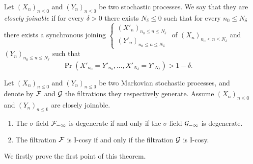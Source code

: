 \documentclass[12pt,a4paper]{article}
\begin{document}
\begin{definition}
Let ${(X_n)}_{n \leq 0}$ and ${(Y_n)}_{n \leq 0}$ be two stochastic processes. 
We say that they are \emph{closely joinable} if for every $\delta >0$ there exists 
$N_\delta \leq 0$ such that for every $n_0 \leq N_\delta$ there exists a 
synchronous joining $\left\{\begin{smallmatrix} {(X'_n)}_{n_0 \leq n \leq N_\delta} \\ 
{(Y'_n)}_{n_0 \leq n \leq N_\delta}
\end{smallmatrix}\right.$ 
of ${(X_n)}_{n_0 \leq n \leq N_\delta}$ and ${(Y_n)}_{n_0 \leq n \leq N_\delta}$ 
such that 
$$
\Pr(X'_{n_0}=Y'_{n_0}, \ldots, X'_{N_\delta}=Y'_{N_\delta}) > 1-\delta. 
$$ 
\end{definition}

\begin{thm}\label{thm:joinable}
Let ${(X_n)}_{n \leq 0}$ and ${(Y_n)}_{n \leq 0}$ be two Markovian stochastic processes, and 
denote by $\mathcal{F}$ and $\mathcal{G}$ the filtrations they respectively generate. 
Assume ${(X_n)}_{n \leq 0}$ and ${(Y_n)}_{n \leq 0}$ are closely joinable. 
\begin{enumerate}
\item The $\sigma$-field $\mathcal{F}_{-\infty}$ is degenerate if and 
only if the $\sigma$-field $\mathcal{G}_{-\infty}$ is degenerate.

\item The filtration $\mathcal{F}$ is I-cosy if and only if the filtration $\mathcal{G}$ is I-cosy.
\end{enumerate}
\end{thm}

We firstly prove the first point of this theorem. 
\end{document}
